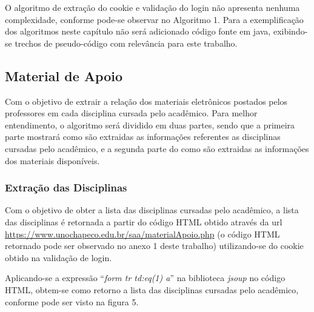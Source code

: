 
  

O algoritmo de extração do cookie e validação do login não apresenta nenhuma complexidade, conforme pode-se observar no Algoritmo 1. Para a exemplificação dos algoritmos neste capítulo não será adicionado código fonte em java, exibindo-se trechos de pseudo-código com relevância para este trabalho.

\subsection{Material de Apoio}
Com o objetivo de extrair a relação dos materiais eletrônicos postados pelos professores em cada disciplina cursada pelo acadêmico. Para melhor entendimento, o algoritmo será dividido em duas partes, sendo que a primeira parte mostrará como são extraidas as informações referentes as disciplinas cursadas pelo acadêmico, e a segunda parte do como são extraidas as informações dos materiais disponíveis.


\subsubsection{Extração das Disciplinas}
Com o objetivo de obter a lista das disciplinas cursadas pelo acadêmico, a lista das disciplinas é retornada a partir do código HTML obtido através da url \url{https://www.unochapeco.edu.br/saa/materialApoio.php} (o código HTML retornado pode ser observado no anexo 1 deste trabalho) utilizando-se do cookie obtido na validação de login.

Aplicando-se a expressão ``\emph{form tr td:eq(1) a}'' na biblioteca \emph{jsoup} no código HTML, obtem-se como retorno a lista das disciplinas cursadas pelo acadêmico, conforme pode ser visto na figura 5.

